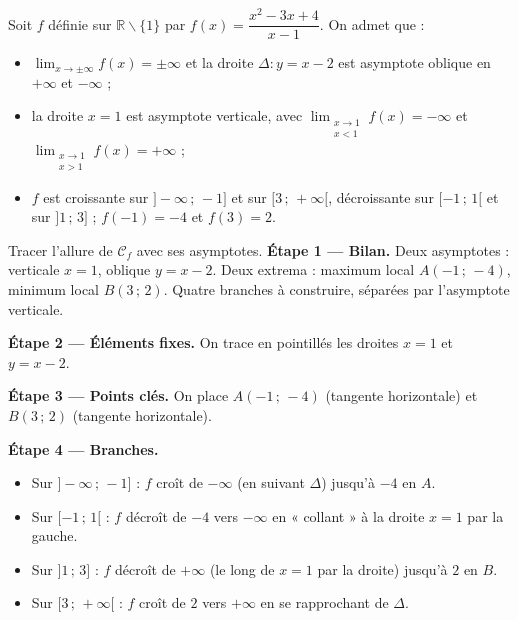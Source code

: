 \documentclass[11pt]{article}
\def\setminus{\mathbin{\backslash}}\let\smallsetminus\setminus
\begin{document}
\begin{exoresolu}
Soit $f$ définie sur $\mathbb{R}\setminus\{1\}$ par $f(x)=\dfrac{x^2-3x+4}{x-1}$. On admet que :
\begin{itemize}
\item $\displaystyle\lim_{x\to\pm\infty}f(x)=\pm\infty$ et la droite $\Delta : y=x-2$ est asymptote oblique en $+\infty$ et $-\infty$ ;
\item la droite $x=1$ est asymptote verticale, avec $\displaystyle\lim_{\substack{x\to1\\x<1}}f(x)=-\infty$ et $\displaystyle\lim_{\substack{x\to1\\x>1}}f(x)=+\infty$ ;
\item $f$ est croissante sur $]-\infty\,;\,-1]$ et sur $[3\,;\,+\infty[$, décroissante sur $[-1\,;\,1[$ et sur $]1\,;\,3]$ ; $f(-1)=-4$ et $f(3)=2$.
\end{itemize}
Tracer l'allure de $\mathcal{C}_f$ avec ses asymptotes.
\tcblower
\textbf{Étape 1 — Bilan.} Deux asymptotes : verticale $x=1$, oblique $y=x-2$. Deux extrema : maximum local $A(-1\,;\,-4)$, minimum local $B(3\,;\,2)$. Quatre branches à construire, séparées par l'asymptote verticale.

\textbf{Étape 2 — Éléments fixes.} On trace en pointillés les droites $x=1$ et $y=x-2$.

\textbf{Étape 3 — Points clés.} On place $A(-1\,;\,-4)$ (tangente horizontale) et $B(3\,;\,2)$ (tangente horizontale).

\textbf{Étape 4 — Branches.}
\begin{itemize}
\item Sur $]-\infty\,;\,-1]$ : $f$ croît de $-\infty$ (en suivant $\Delta$) jusqu'à $-4$ en $A$.
\item Sur $[-1\,;\,1[$ : $f$ décroît de $-4$ vers $-\infty$ en « collant » à la droite $x=1$ par la gauche.
\item Sur $]1\,;\,3]$ : $f$ décroît de $+\infty$ (le long de $x=1$ par la droite) jusqu'à $2$ en $B$.
\item Sur $[3\,;\,+\infty[$ : $f$ croît de $2$ vers $+\infty$ en se rapprochant de $\Delta$.
\end{itemize}


\end{exoresolu}
\end{document}
